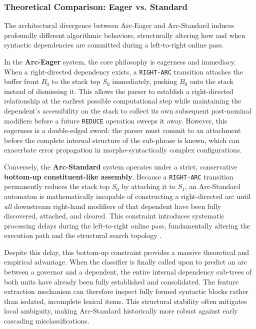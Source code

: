\documentclass[12pt,a4paper]{article}
\begin{document}
\subsubsection{Theoretical Comparison: Eager vs. Standard}
\label{subsubsec:theoretical_comparison}

The architectural divergence between Arc-Eager and Arc-Standard induces profoundly different algorithmic behaviors, structurally altering how and when syntactic dependencies are committed during a left-to-right online pass.

In the \textbf{Arc-Eager} system, the core philosophy is eagerness and immediacy. When a right-directed dependency exists, a \texttt{RIGHT-ARC} transition attaches the buffer front $B_0$ to the stack top $S_0$ immediately, pushing $B_0$ onto the stack instead of dismissing it. This allows the parser to establish a right-directed relationship at the earliest possible computational step while maintaining the dependent's accessibility on the stack to collect its own subsequent post-nominal modifiers before a future \texttt{REDUCE} operation sweeps it away. However, this eagerness is a double-edged sword: the parser must commit to an attachment before the complete internal structure of the sub-phrase is known, which can exacerbate error propagation in morpho-syntactically complex configurations.

Conversely, the \textbf{Arc-Standard} system operates under a strict, conservative \textbf{bottom-up constituent-like assembly}. Because a \texttt{RIGHT-ARC} transition permanently reduces the stack top $S_0$ by attaching it to $S_1$, an Arc-Standard automaton is mathematically incapable of constructing a right-directed arc until \textit{all} downstream right-hand modifiers of that dependent have been fully discovered, attached, and cleared. This constraint introduces systematic processing delays during the left-to-right online pass, fundamentally altering the execution path and the structural search topology \cite{kuhlmann2011}.

Despite this delay, this bottom-up constraint provides a massive theoretical and empirical advantage. When the classifier is finally called upon to predict an arc between a governor and a dependent, the entire internal dependency sub-trees of both units have already been fully established and consolidated. The feature extraction mechanism can therefore inspect fully formed syntactic blocks rather than isolated, incomplete lexical items. This structural stability often mitigates local ambiguity, making Arc-Standard historically more robust against early cascading misclassifications.
\end{document}
